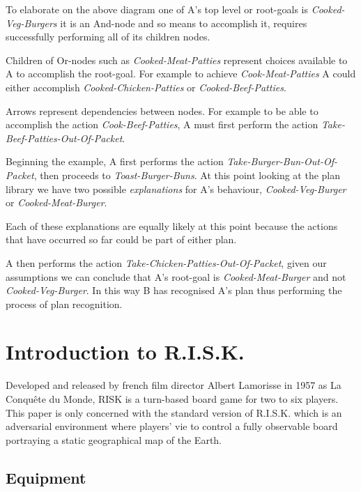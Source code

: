 \documentclass[parskip]{cs4rep}
\begin{document}
To elaborate on the above diagram one of A's top level or root-goals is \textit{Cooked-Veg-Burgers} it is an And-node and so means to accomplish it, requires successfully performing all of its children nodes. 

Children of Or-nodes such as \textit{Cooked-Meat-Patties} represent choices available to A to accomplish the root-goal. For example to achieve \textit{Cook-Meat-Patties} A could either accomplish \textit{Cooked-Chicken-Patties} or \textit{Cooked-Beef-Patties}.

Arrows represent dependencies between nodes. For example to be able to accomplish the action \textit{Cook-Beef-Patties}, A must first perform the action \textit{Take-Beef-Patties-Out-Of-Packet}.

Beginning the example, A first performs the action \textit{Take-Burger-Bun-Out-Of-Packet}, then proceeds to \textit{Toast-Burger-Buns}. At this point looking at the plan library we have two possible \textit{explanations} for A's behaviour, \textit{Cooked-Veg-Burger} or \textit{Cooked-Meat-Burger}.

Each of these explanations are equally likely at this point because the actions that have occurred so far could be part of either plan.

A then performs the action \textit{Take-Chicken-Patties-Out-Of-Packet}, given our assumptions we can conclude that A's root-goal is \textit{Cooked-Meat-Burger} and not \textit{Cooked-Veg-Burger}. In this way B has recognised A's plan thus performing the process of plan recognition.

\newpage

\section{Introduction to R.I.S.K.}

Developed and released by french film director Albert Lamorisse in 1957 as La Conqu\^ete du Monde, RISK is a turn-based board game for two to six players. This paper is only concerned with the standard version of R.I.S.K. which is an adversarial environment where players' vie to control a fully observable board portraying a static geographical map of the Earth.

\subsection{Equipment}
\end{document}
